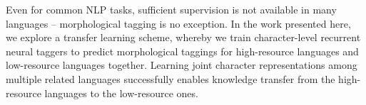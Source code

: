 Even for common NLP tasks, sufficient supervision is not available in many languages -- morphological tagging is no exception. In the work presented here, we explore a transfer learning scheme, whereby we train character-level recurrent neural taggers to predict morphological taggings for high-resource languages and low-resource languages together. Learning joint character representations among multiple related languages successfully enables knowledge transfer from the high-resource languages to the low-resource ones.

